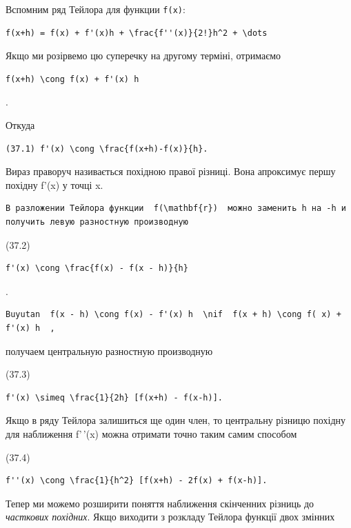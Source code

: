 \documentclass[
  ukrainian,
]{article}
\begin{document}
Вспомним ряд Тейлора для функции \texttt{f(x)}:

\begin{verbatim}
f(x+h) = f(x) + f'(x)h + \frac{f''(x)}{2!}h^2 + \dots
\end{verbatim}

Якщо ми розірвемо цю суперечку на другому терміні, отримаємо

\begin{verbatim}
f(x+h) \cong f(x) + f'(x) h
\end{verbatim}

.

Откуда

\begin{verbatim}
(37.1) f'(x) \cong \frac{f(x+h)-f(x)}{h}.
\end{verbatim}

Вираз праворуч називається похідною правої різниці. Вона апроксимує
першу похідну f'(x) у точці x.

\begin{verbatim}
В разложении Тейлора функции  f(\mathbf{r})  можно заменить h на -h и получить левую разностную производную
\end{verbatim}

(37.2)

\begin{verbatim}
f'(x) \cong \frac{f(x) - f(x - h)}{h}
\end{verbatim}

.

\begin{verbatim}
Buyutan  f(x - h) \cong f(x) - f'(x) h  \nif  f(x + h) \cong f( x) + f'(x) h  ,
\end{verbatim}

получаем центральную разностную производную

(37.3)

\begin{verbatim}
f'(x) \simeq \frac{1}{2h} [f(x+h) - f(x-h)].
\end{verbatim}

Якщо в ряду Тейлора залишиться ще один член, то центральну різницю
похідну для наближення f'\,'(x) можна отримати точно таким самим
способом

(37.4)

\begin{verbatim}
f''(x) \cong \frac{1}{h^2} [f(x+h) - 2f(x) + f(x-h)].
\end{verbatim}

Тепер ми можемо розширити поняття наближення скінченних різниць до
\emph{часткових похідних}. Якщо виходити з розкладу Тейлора функції двох
змінних
\end{document}
